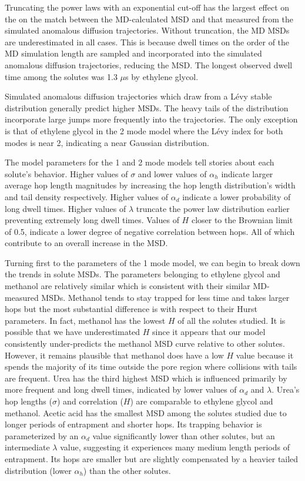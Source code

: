 \documentclass{article}
\begin{document}
  Truncating the power laws with an exponential cut-off has the largest effect on the on 
  the match between the MD-calculated MSD and that measured from the simulated anomalous
  diffusion trajectories. Without truncation, the MD MSDs are underestimated in all cases.
  This is because dwell times on the order of the MD simulation length are sampled and 
  incorporated into the simulated anomalous diffusion trajectories, reducing the MSD. 
  The longest observed dwell time among the solutes was 1.3 $\mu$s by ethylene glycol.
  
  Simulated anomalous diffusion trajectories which draw from a L\'evy stable distribution
  generally predict higher MSDs. The heavy tails of the distribution incorporate large
  jumps more frequently into the trajectories. The only exception is that of ethylene
  glycol in the 2 mode model where the L\'evy index for both modes is near 2, indicating
  a near Gaussian distribution.
  
  The model parameters for the 1 and 2 mode models tell stories about each solute's behavior. 
  Higher values of $\sigma$ and lower values of $\alpha_h$ indicate larger average 
  hop length magnitudes by increasing the hop length distribution's width and tail 
  density respectively. Higher values of $\alpha_d$ indicate a lower probability of 
  long dwell times. Higher values of $\lambda$ truncate the power law distribution 
  earlier preventing extremely long dwell times. Values of $H$ closer to the Brownian
  limit of 0.5, indicate a lower degree of negative correlation between hops. All 
  of which contribute to an overall increase in the MSD.
  
  Turning first to the parameters of the 1 mode model, we can begin to break down the
  trends in solute MSDs. The parameters belonging to ethylene glycol and methanol are
  relatively similar which is consistent with their similar MD-measured MSDs. Methanol 
  tends to stay trapped for less time and takes larger hops but the most substantial
  difference is with respect to their Hurst parameters. In fact, methanol has the lowest
  $H$ of all the solutes studied. It is possible that we have underestimated $H$ since 
  it appears that our model consistently under-predicts the methanol MSD curve relative
  to other solutes. However, it remains plausible that methanol does have a low $H$ 
  value because it spends the majority of its time outside the pore region where collisions
  with tails are frequent. Urea has the third highest MSD which is influenced primarily
  by more frequent and long dwell times, indicated by lower values of $\alpha_d$ and 
  $\lambda$. Urea's hop lengths ($\sigma$) and correlation ($H$) are comparable to ethylene
  glycol and methanol. Acetic acid has the smallest MSD among the solutes studied due 
  to longer periods of entrapment and shorter hops. Its trapping behavior is parameterized
  by an $\alpha_d$ value significantly lower than other solutes, but an intermediate 
  $\lambda$ value, suggesting it experiences many medium length periods of entrapment. 
  Its hops are smaller but are slightly compensated by a heavier tailed distribution 
  (lower $\alpha_h$) than the other solutes. 
  
\end{document}

